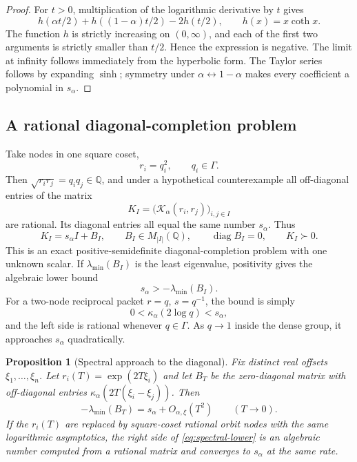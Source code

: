 \documentclass[11pt]{article}
\newtheorem{proposition}[theorem]{Proposition}
\theoremstyle{definition}
\theoremstyle{remark}
\newcommand{\Q}{\mathbb{Q}}
\begin{document}
\begin{proof}
For $t>0$, multiplication of the logarithmic derivative by $t$ gives
\[
 h(\alpha t/2)+h((1-\alpha)t/2)-2h(t/2),
 \qquad h(x)=x\coth x.
\]
The function $h$ is strictly increasing on $(0,\infty)$, and each of the first two arguments is strictly smaller than $t/2$.  Hence the expression is negative.  The limit at infinity follows immediately from the hyperbolic form.  The Taylor series follows by expanding $\sinh$; symmetry under $\alpha\leftrightarrow1-\alpha$ makes every coefficient a polynomial in $s_\alpha$.
\end{proof}

\subsection{A rational diagonal-completion problem}

Take nodes in one square coset,
\begin{equation}\label{eq:square-nodes}
 r_i=q_i^2,
 \qquad q_i\in\Gamma.
\end{equation}
Then $\sqrt{r_ir_j}=q_iq_j\in\Q$, and under a hypothetical counterexample all off-diagonal entries of the matrix
\begin{equation}\label{eq:K-matrix}
 K_I=\bigl(\mathcal K_\alpha(r_i,r_j)\bigr)_{i,j\in I}
\end{equation}
are rational.  Its diagonal entries all equal the same number $s_\alpha$.  Thus
\begin{equation}\label{eq:K-completion}
 K_I=s_\alpha I+B_I,
 \qquad B_I\in M_{|I|}(\Q),
 \qquad \operatorname{diag}B_I=0,
 \qquad K_I\succ0.
\end{equation}
This is an exact positive-semidefinite diagonal-completion problem with one unknown scalar.  If $\lambda_{\min}(B_I)$ is the least eigenvalue, positivity gives the algebraic lower bound
\begin{equation}\label{eq:spectral-lower}
 s_\alpha>-\lambda_{\min}(B_I).
\end{equation}
For a two-node reciprocal packet $r=q$, $s=q^{-1}$, the bound is simply
\begin{equation}\label{eq:kappa-rational-lower}
 0<\kappa_\alpha(2\log q)<s_\alpha,
\end{equation}
and the left side is rational whenever $q\in\Gamma$.  As $q\to1$ inside the dense group, it approaches $s_\alpha$ quadratically.

\begin{proposition}[Spectral approach to the diagonal]\label{prop:spectral-approach}
Fix distinct real offsets $\xi_1,\dots,\xi_n$.  Let $r_i(T)=\exp(2T\xi_i)$ and let $B_T$ be the zero-diagonal matrix with off-diagonal entries $\kappa_\alpha(2T(\xi_i-\xi_j))$.  Then
\begin{equation}\label{eq:spectral-approach}
 -\lambda_{\min}(B_T)=s_\alpha+O_{\alpha,\xi}(T^2)
 \qquad(T\to0).
\end{equation}
If the $r_i(T)$ are replaced by square-coset rational orbit nodes with the same logarithmic asymptotics, the right side of \eqref{eq:spectral-lower} is an algebraic number computed from a rational matrix and converges to $s_\alpha$ at the same rate.
\end{proposition}
\end{document}
